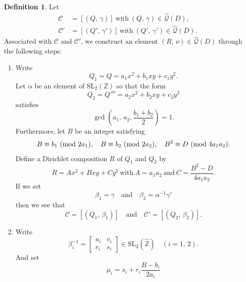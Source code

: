 \documentclass[reqno,11pt]{article}
\newcommand{\Mod}[1]{\ (\textup{mod}\ #1)}
\theoremstyle{plain} %
\theoremstyle{definition} %
\newtheorem{definition}[theorem]{\indent\sc Definition}
\begin{document}
\begin{definition}\label{explicit}
Let
\begin{align*}
\mathcal{C}&=[(Q,\,\gamma)]~\textrm{with}~(Q,\,\gamma)\in\widehat{\mathcal{Q}}(D),\\
\mathcal{C}'&=[(Q',\,\gamma')]~\textrm{with}~(Q',\,\gamma')\in\widehat{\mathcal{Q}}(D).
\end{align*}
Associated with $\mathcal{C}$ and $\mathcal{C}'$,
we construct an element $(R,\,\nu)\in\widehat{\mathcal{Q}}(D)$ through the following steps:
\begin{enumerate}
\item[Step 1.] Write
\begin{equation*}
Q_1=Q=a_1x^2+b_1xy+c_1y^2. 
\end{equation*}
Let $\alpha$ be an element of $\mathrm{SL}_2(\mathbb{Z})$ 
so that the form
\begin{equation*}
Q_2=Q'^\alpha=a_2x^2+b_2xy+c_2y^2
\end{equation*}
satisfies
\begin{equation*}
\gcd\left(a_1,\,a_2,\frac{b_1+b_2}{2}\right)=1. 
\end{equation*}
Furthermore, let $B$ be an integer satisfying
\begin{align*}
B\equiv b_1\Mod{2a_1},\quad
B\equiv b_2\Mod{2a_2},\quad
B^2\equiv D\Mod{4a_1a_2}.\nonumber
\end{align*}
Define a Dirichlet composition $R$ of $Q_1$ and $Q_2$ by
\begin{equation*}
R=Ax^2+Bxy+Cy^2~\textrm{with}~
A=a_1a_2~\textrm{and}~C=\frac{B^2-D}{4a_1a_2}. 
\end{equation*}
If we set
\begin{equation*}
\beta_1=\gamma\quad\textrm{and}\quad
\beta_2=\alpha^{-1}\gamma'
\end{equation*}
then we see that
\begin{equation}\label{CQbCQb}
\mathcal{C}=[(Q_1,\,\beta_1)]\quad\textrm{and}\quad
\mathcal{C}'=[(Q_2,\,\beta_2)].
\end{equation}
\item[Step 2.] Write
\begin{equation}\label{beta}
\beta_i^{-1}=\begin{bmatrix}
u_i&v_i\\r_i&s_i\end{bmatrix}
\in\mathrm{SL}_2(\widehat{\mathbb{Z}})\quad(i=1,\,2).  
\end{equation}
And set
\begin{equation*}
\mu_i=s_i+r_i\frac{B-b_i}{2a_i}

\end{equation*}
\end{enumerate}
\end{definition}
\end{document}
